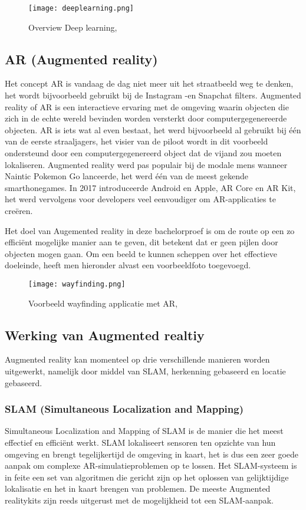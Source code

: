 \begin{figure}[H]
	\centering
	\texttt{[image: deeplearning.png]}
	\caption{Overview Deep learning, \autocite{ObjRec2020}}
\end{figure}

\subsection{AR (Augmented reality)}
Het concept AR is vandaag de dag niet meer uit het straatbeeld weg te denken, het wordt bijvoorbeeld gebruikt bij de Instagram -en Snapchat filters. Augmented reality of AR is een interactieve ervaring met de omgeving waarin objecten die zich in de echte wereld bevinden worden versterkt door computergegenereerde objecten. AR is iets wat al even bestaat, het werd bijvoorbeeld al gebruikt bij één van de eerste straaljagers, het visier van de piloot wordt in dit voorbeeld ondersteund door een computergegenereerd object dat de vijand zou moeten lokaliseren. Augmented reality werd pas populair bij de modale mens wanneer Naintic Pokemon Go lanceerde, het werd één van de meest gekende smarthonegames. In 2017 introduceerde Android en Apple, AR Core en AR Kit, het werd vervolgens voor developers veel eenvoudiger om AR-applicaties te creëren. \autocite{NewGenApps2017}

Het doel van Augemented reality in deze bachelorproef is om de route op een zo efficiënt mogelijke manier aan te geven, dit betekent dat er geen pijlen door objecten mogen gaan. Om een beeld te kunnen scheppen over het effectieve doeleinde, heeft men hieronder alvast een voorbeeldfoto toegevoegd.

\begin{figure}[H]
	\centering
	\texttt{[image: wayfinding.png]}
	\caption{Voorbeeld wayfinding applicatie met AR, \autocite{MAXST2019}}
\end{figure}

\subsection{Werking van Augmented realtiy}
Augmented reality kan momenteel op drie verschillende manieren worden uitgewerkt, namelijk door middel van SLAM, herkenning gebaseerd en locatie gebaseerd.

\subsubsection{SLAM (Simultaneous Localization and Mapping)}
Simultaneous Localization and Mapping of SLAM is de manier die het meest effectief en efficiënt werkt. SLAM lokaliseert sensoren ten opzichte van hun omgeving en brengt tegelijkertijd de omgeving in kaart, het is dus een zeer goede aanpak om complexe AR-simulatieproblemen op te lossen. Het SLAM-systeem is in feite een set van algoritmen die gericht zijn op het oplossen van gelijktijdige lokalisatie en het in kaart brengen van problemen. De meeste Augmented realitykits zijn reeds uitgerust met de mogelijkheid tot een SLAM-aanpak. \autocite{NewGenApps2017}

